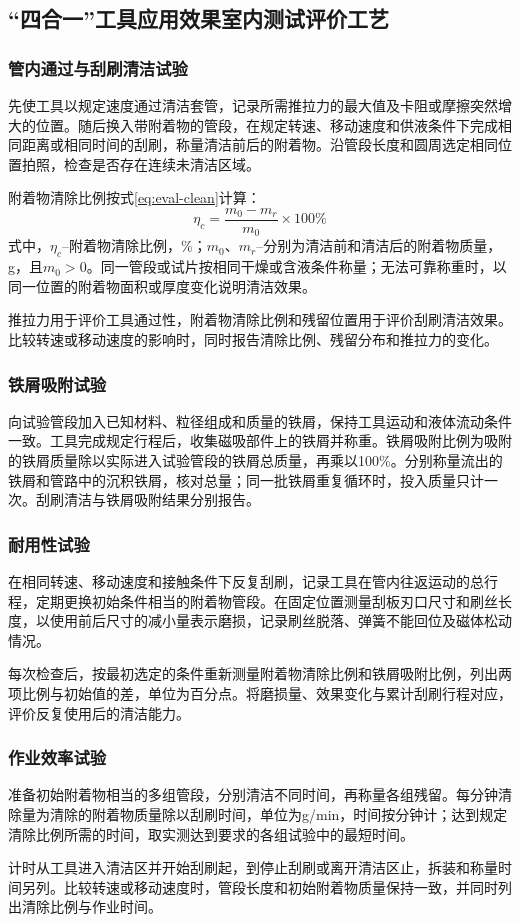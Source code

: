 \subsection{“四合一”工具应用效果室内测试评价工艺}
\label{sec:eval-4in1}

\subsubsection{管内通过与刮刷清洁试验}
先使工具以规定速度通过清洁套管，记录所需推拉力的最大值及卡阻或摩擦突然增大的位置。随后换入带附着物的管段，在规定转速、移动速度和供液条件下完成相同距离或相同时间的刮刷，称量清洁前后的附着物。沿管段长度和圆周选定相同位置拍照，检查是否存在连续未清洁区域。

附着物清除比例按式\eqref{eq:eval-clean}计算：
\begin{equation}
	\eta_c=\frac{m_0-m_r}{m_0}\times 100\%
	\label{eq:eval-clean}
\end{equation}
式中，$\eta_c$--附着物清除比例，\%；$m_0$、$m_r$--分别为清洁前和清洁后的附着物质量，g，且$m_0>0$。同一管段或试片按相同干燥或含液条件称量；无法可靠称重时，以同一位置的附着物面积或厚度变化说明清洁效果。

推拉力用于评价工具通过性，附着物清除比例和残留位置用于评价刮刷清洁效果。比较转速或移动速度的影响时，同时报告清除比例、残留分布和推拉力的变化。

\subsubsection{铁屑吸附试验}
向试验管段加入已知材料、粒径组成和质量的铁屑，保持工具运动和液体流动条件一致。工具完成规定行程后，收集磁吸部件上的铁屑并称重。铁屑吸附比例为吸附的铁屑质量除以实际进入试验管段的铁屑总质量，再乘以100\%。分别称量流出的铁屑和管路中的沉积铁屑，核对总量；同一批铁屑重复循环时，投入质量只计一次。刮刷清洁与铁屑吸附结果分别报告。

\subsubsection{耐用性试验}
在相同转速、移动速度和接触条件下反复刮刷，记录工具在管内往返运动的总行程，定期更换初始条件相当的附着物管段。在固定位置测量刮板刃口尺寸和刷丝长度，以使用前后尺寸的减小量表示磨损，记录刷丝脱落、弹簧不能回位及磁体松动情况。

每次检查后，按最初选定的条件重新测量附着物清除比例和铁屑吸附比例，列出两项比例与初始值的差，单位为百分点。将磨损量、效果变化与累计刮刷行程对应，评价反复使用后的清洁能力。

\subsubsection{作业效率试验}
准备初始附着物相当的多组管段，分别清洁不同时间，再称量各组残留。每分钟清除量为清除的附着物质量除以刮刷时间，单位为g/min，时间按分钟计；达到规定清除比例所需的时间，取实测达到要求的各组试验中的最短时间。

计时从工具进入清洁区并开始刮刷起，到停止刮刷或离开清洁区止，拆装和称量时间另列。比较转速或移动速度时，管段长度和初始附着物质量保持一致，并同时列出清除比例与作业时间。
